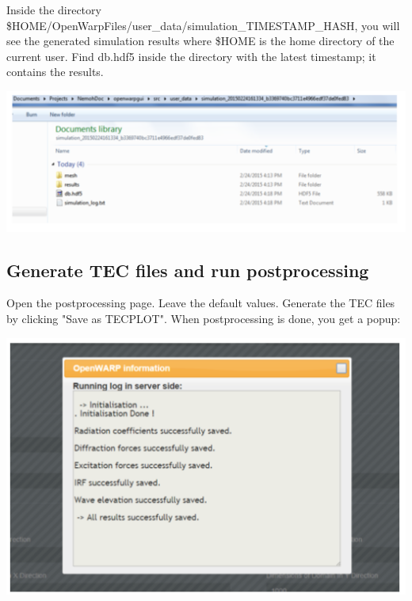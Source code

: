 \documentclass[12pt]{article}
\begin{document}
Inside the directory \$HOME/OpenWarpFiles/user{\_}data/simulation{\_}TIMESTAMP{\_}HASH, you will see the generated simulation results where \$HOME is the home directory of the current user.
Find db.hdf5 inside the directory with the latest timestamp; it contains the results.

\vspace{\abovedisplayskip}
\begin{minipage}{\linewidth}
	\centering
	\includegraphics[scale=0.5]{img/52}
\end{minipage}
\vspace{\belowdisplayskip}

\subsection{Generate TEC files and run postprocessing}

Open the postprocessing page.
Leave the default values. Generate the TEC files by clicking "Save as TECPLOT". When postprocessing is done, you get a popup:

\vspace{\abovedisplayskip}
\begin{minipage}{\linewidth}
	\centering
	\includegraphics[scale=0.5]{img/53}
\end{minipage}
\vspace{\belowdisplayskip}
\end{document}
